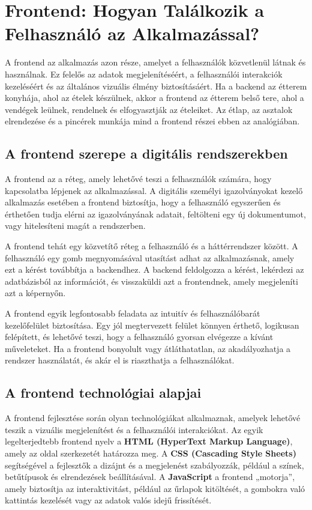 \documentclass[
]{thesis-ekf}
\theoremstyle{definition}
\theoremstyle{remark}
\begin{document}
	\chapter{Frontend: Hogyan Találkozik a Felhasználó az Alkalmazással?}
	
	A frontend az alkalmazás azon része, amelyet a felhasználók közvetlenül látnak és használnak. Ez felelős az adatok megjelenítéséért, a felhasználói interakciók kezeléséért és az általános vizuális élmény biztosításáért. Ha a backend az étterem konyhája, ahol az ételek készülnek, akkor a frontend az étterem belső tere, ahol a vendégek leülnek, rendelnek és elfogyasztják az ételeiket. Az étlap, az asztalok elrendezése és a pincérek munkája mind a frontend részei ebben az analógiában.
	
	\section{A frontend szerepe a digitális rendszerekben}
	
	A frontend az a réteg, amely lehetővé teszi a felhasználók számára, hogy kapcsolatba lépjenek az alkalmazással. A digitális személyi igazolványokat kezelő alkalmazás esetében a frontend biztosítja, hogy a felhasználó egyszerűen és érthetően tudja elérni az igazolványának adatait, feltölteni egy új dokumentumot, vagy hitelesíteni magát a rendszerben.
	
	A frontend tehát egy közvetítő réteg a felhasználó és a háttérrendszer között. A felhasználó egy gomb megnyomásával utasítást adhat az alkalmazásnak, amely ezt a kérést továbbítja a backendhez. A backend feldolgozza a kérést, lekérdezi az adatbázisból az információt, és visszaküldi azt a frontendnek, amely megjeleníti azt a képernyőn.
	
	A frontend egyik legfontosabb feladata az intuitív és felhasználóbarát kezelőfelület biztosítása. Egy jól megtervezett felület könnyen érthető, logikusan felépített, és lehetővé teszi, hogy a felhasználó gyorsan elvégezze a kívánt műveleteket. Ha a frontend bonyolult vagy átláthatatlan, az akadályozhatja a rendszer használatát, és akár el is riaszthatja a felhasználókat.
	
	\section{A frontend technológiai alapjai}
	
	A frontend fejlesztése során olyan technológiákat alkalmaznak, amelyek lehetővé teszik a vizuális megjelenítést és a felhasználói interakciókat. Az egyik legelterjedtebb frontend nyelv a \textbf{HTML (HyperText Markup Language)}, amely az oldal szerkezetét határozza meg. A \textbf{CSS (Cascading Style Sheets)} segítségével a fejlesztők a dizájnt és a megjelenést szabályozzák, például a színek, betűtípusok és elrendezések beállításával. A \textbf{JavaScript} a frontend „motorja”, amely biztosítja az interaktivitást, például az űrlapok kitöltését, a gombokra való kattintás kezelését vagy az adatok valós idejű frissítését.
	
\end{document}
